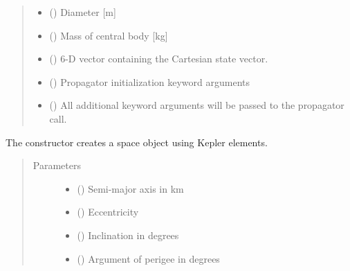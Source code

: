 \documentclass[letterpaper,10pt,english]{sphinxmanual}
\begin{document}
\begin{fulllineitems}
\begin{quote}
\begin{description}
\begin{itemize}
\item {} 
 () \textendash{} Diameter {[}m{]}

\item {} 
 () \textendash{} Mass of central body {[}kg{]}

\item {} 
 () \textendash{} 6-D vector containing the Cartesian state vector.

\item {} 
 () \textendash{} Propagator initialization keyword arguments

\item {} 
 () \textendash{} All additional keyword arguments will be passed to the propagator call.

\end{itemize}

\end{description}\end{quote}

The constructor creates a space object using Kepler elements.
\begin{quote}\begin{description}
\item[{Parameters}] \leavevmode\begin{itemize}
\item {} 
 () \textendash{} Semi-major axis in km

\item {} 
 () \textendash{} Eccentricity

\item {} 
 () \textendash{} Inclination in degrees

\item {} 
 () \textendash{} Argument of perigee in degrees


\end{itemize}
\end{description}
\end{quote}
\end{fulllineitems}
\end{document}
